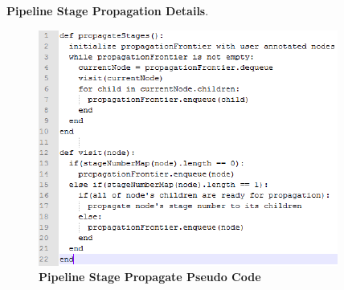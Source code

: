 {\bf Pipeline Stage Propagation Details}. 

\begin{figure}[htb]
\centering
\includegraphics{figures/propagate_pseudo_code.pdf}
\caption{{\bf Pipeline Stage Propagate Pseudo Code}}
\label{fig:propagate}
\end{figure}

